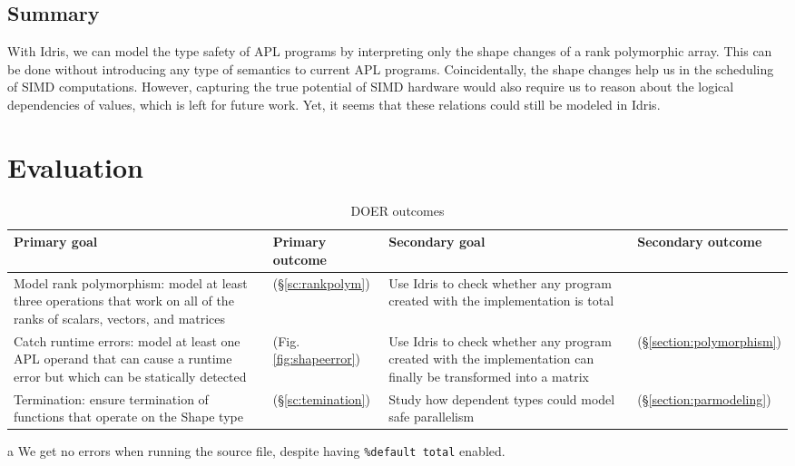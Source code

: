 \documentclass{report}
\newcommand{\cmark}{\ding{51}}
\begin{document}
\section*{Summary}

With Idris, we can model the type safety of APL programs by interpreting only the shape changes of a rank polymorphic array. This can be done without introducing any type of semantics to current APL programs. Coincidentally, the shape changes help us in the scheduling of SIMD computations. However, capturing the true potential of SIMD hardware would also require us to reason about the logical dependencies of values, which is left for future work. Yet, it seems that these relations could still be modeled in Idris.

\chapter{Evaluation}
\label{ch:evaluation}

\begin{table}
\begin{center}
\begin{threeparttable}[b]
\caption{DOER outcomes}
\label{fig:doer}
\begin{tabular}{|p{4cm}|p{2cm}|p{4cm}|p{2cm}|}
\hline
Primary goal
& Primary outcome
& Secondary goal
& Secondary outcome
\\
\hline
Model rank polymorphism: model at least three operations that work on all of the ranks of scalars, vectors, and matrices
& \cmark (§\ref{sc:rankpolym})
& Use Idris to check whether any program created with the implementation is total
& \cmark\tnote{a}
\\
\hline
Catch runtime errors: model at least one APL operand that can cause a runtime error but which can be statically detected
& \cmark (Fig. \ref{fig:shapeerror})
& Use Idris to check whether any program created with the implementation can finally be transformed into a matrix
& \cmark (§\ref{section:polymorphism})
\\
\hline
Termination: ensure termination of functions that operate on the Shape type
& \cmark (§\ref{sc:temination})
& Study how dependent types could model safe parallelism
& \cmark (§\ref{section:parmodeling})
\\
\hline
\end{tabular}
    \begin{tablenotes}
    \item [a] We get no errors when running the source file, despite having \verb|%default total| enabled.
    \end{tablenotes}    
    \end{threeparttable}
\end{center}
\end{table}
\end{document}
